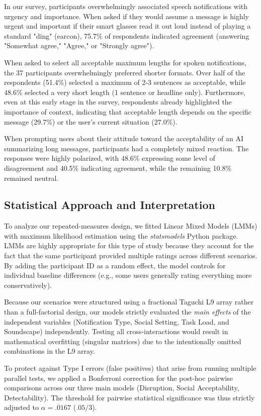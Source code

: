 In our survey, participants overwhelmingly associated speech notifications with urgency and importance. When asked if they would assume a message is highly urgent and important if their smart glasses read it out loud instead of playing a standard "ding" (earcon), 75.7\% of respondents indicated agreement (answering "Somewhat agree," "Agree," or "Strongly agree").

When asked to select all acceptable maximum lengths for spoken notifications, the 37 participants overwhelmingly preferred shorter formats. Over half of the respondents (51.4\%) selected a maximum of 2-3 sentences as acceptable, while 48.6\% selected a very short length (1 sentence or headline only). Furthermore, even at this early stage in the survey, respondents already highlighted the importance of context, indicating that acceptable length depends on the specific message (29.7\%) or the user's current situation (27.0\%).

When prompting users about their attitude toward the acceptability of an AI summarizing long messages, participants had a completely mixed reaction. The responses were highly polarized, with 48.6\% expressing some level of disagreement and 40.5\% indicating agreement, while the remaining 10.8\% remained neutral.

\subsection{Statistical Approach and Interpretation}
To analyze our repeated-measures design, we fitted Linear Mixed Models (LMMs) with maximum likelihood estimation using the \textit{statsmodels} Python package. LMMs are highly appropriate for this type of study because they account for the fact that the same participant provided multiple ratings across different scenarios. By adding the participant ID as a random effect, the model controls for individual baseline differences (e.g., some users generally rating everything more conservatively). 

Because our scenarios were structured using a fractional Taguchi L9 array rather than a full-factorial design, our models strictly evaluated the \textit{main effects} of the independent variables (Notification Type, Social Setting, Task Load, and Soundscape) independently. Testing all cross-interactions would result in mathematical overfitting (singular matrices) due to the intentionally omitted combinations in the L9 array.

To protect against Type I errors (false positives) that arise from running multiple parallel tests, we applied a Bonferroni correction for the post-hoc pairwise comparisons across our three main models (Disruption, Social Acceptability, Detectability). The threshold for pairwise statistical significance was thus strictly adjusted to $\alpha = .0167$ ($.05 / 3$). 


